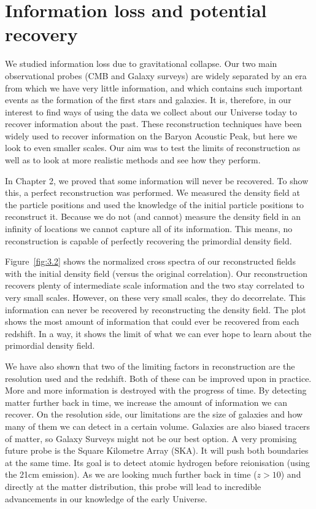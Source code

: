 
\section{Information loss and potential recovery}

We studied information loss due to gravitational collapse. Our two main observational probes (CMB and Galaxy surveys) are widely separated by an era from which we have very little information, and which contains such important events as the formation of the first stars and galaxies. It is, therefore, in our interest to find ways of using the data we collect about our Universe today to recover information about the past. These reconstruction techniques have been widely used to recover information on the Baryon Acoustic Peak, but here we look to even smaller scales. Our aim was to test the limits of reconstruction as well as to look at more realistic methods and see how they perform.

In Chapter 2, we proved that some information will never be recovered. To show this, a perfect reconstruction was performed. We measured the density field at the particle positions and used the knowledge of the initial particle positions to reconstruct it. Because we do not (and cannot) measure the density field in an infinity of locations we cannot capture all of its information. This means, no reconstruction is capable of perfectly recovering the primordial density field.

Figure~\ref{fig:3.2} shows the normalized cross spectra of our reconstructed fields with the initial density field (versus the original correlation). Our reconstruction recovers plenty of  intermediate scale information and the two stay correlated to very small scales. However, on these very small scales, they do decorrelate. This information can never be recovered by reconstructing the density field. The plot shows the most amount of information that could ever be recovered from each redshift. In a way, it shows the limit of what we can ever hope to learn about the primordial density field. 

We have also shown that two of the limiting factors in reconstruction are the resolution used and the redshift. Both of these can be improved upon in practice. More and more information is destroyed with the progress of time. By detecting matter further back in time, we increase the amount of information we can recover. On the resolution side, our limitations are the size of galaxies and how many of them we can detect in a certain volume. Galaxies are also biased tracers of matter, so Galaxy Surveys might not be our best option. A very promising future probe is the Square Kilometre Array (SKA). It will push both boundaries at the same time. Its goal is to detect atomic hydrogen before reionisation (using the 21cm emission). As we are looking much further back in time ($z>10$) and directly at the matter distribution, this probe will lead to incredible advancements in our knowledge of the early Universe.


